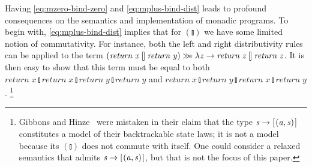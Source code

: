 \documentclass{llncs}
\newcommand{\Varid}[1]{\mathit{#1}}
\let\Varid\mathit
\newcommand{\scm}[1]{\textcolor{teal}{#1}}
\begin{document}
Having \eqref{eq:mzero-bind-zero} and \eqref{eq:mplus-bind-dist} leads to profound consequences on the semantics and implementation of monadic programs.
To begin with, \eqref{eq:mplus-bind-dist} implies that for \ensuremath{(\talloblong)} we have some
limited notion of commutativity.
For instance, both the left and right distributivity rules can be applied to
the term \ensuremath{(\Varid{return}\;\Varid{x}\mathbin{\talloblong}\Varid{return}\;\Varid{y})\mathrel{\hstretch{0.7}{>\!\!>\!\!=}}\lambda \Varid{z}\to \Varid{return}\;\Varid{z}\mathbin{\talloblong}\Varid{return}\;\Varid{z}}.
It is then easy to show that this term must be equal to both
\ensuremath{\Varid{return}\;\Varid{x}\mathbin{\talloblong}\Varid{return}\;\Varid{x}\mathbin{\talloblong}\Varid{return}\;\Varid{y}\mathbin{\talloblong}\Varid{return}\;\Varid{y}} and
\ensuremath{\Varid{return}\;\Varid{x}\mathbin{\talloblong}\Varid{return}\;\Varid{y}\mathbin{\talloblong}\Varid{return}\;\Varid{x}\mathbin{\talloblong}\Varid{return}\;\Varid{y}}.%
\footnote{
  Gibbons and Hinze~\cite{GibbonsHinze:11:Just} were mistaken in their claim
  that the type \ensuremath{\Varid{s}\to [\mskip1.5mu (\Varid{a},\Varid{s})\mskip1.5mu]} constitutes a model of their backtrackable state
  laws; it is not a model because its \ensuremath{(\talloblong)} does not commute with itself.
  One could consider a relaxed semantics that admits \ensuremath{\Varid{s}\to [\mskip1.5mu (\Varid{a},\Varid{s})\mskip1.5mu]}, but that is
  not the focus of this paper.
}

\end{document}
